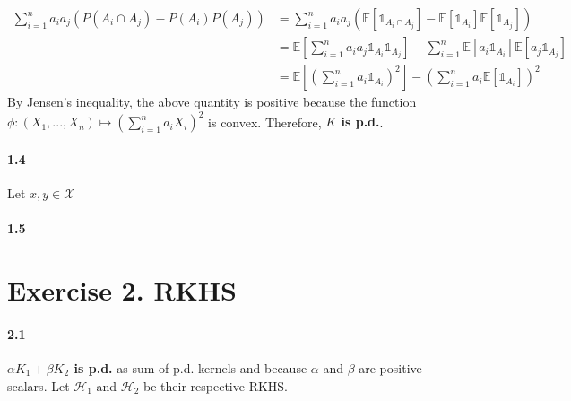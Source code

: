 \documentclass[10pt]{article}
\begin{document}
    \begin{align*}
        \sum_{i=1}^n a_i a_j (P(A_i \cap A_j) - P(A_i) P(A_j)) &= 
        \sum_{i=1}^n a_i a_j (\mathbb{E}[\mathds{1}_{A_i \cap A_j}] - 
        \mathbb{E}[\mathds{1}_{A_i}] \mathbb{E}[\mathds{1}_{A_j}])\\
        &= \mathbb{E}\left[\sum_{i=1}^n a_i a_j \mathds{1}_{A_i}\mathds{1}_{A_j} 
        \right] - \sum_{i=1}^n \mathbb{E}[a_i\mathds{1}_{A_i}] 
        \mathbb{E}[a_j\mathds{1}_{A_j}]\\
        &= \mathbb{E}\left[\left(\sum_{i=1}^n a_i\mathds{1}_{A_i}\right)^2
        \right] - \left(\sum_{i=1}^n a_i \mathbb{E}[\mathds{1}_{A_i}] \right)^2
    \end{align*}
    By Jensen's inequality, the above quantity is positive because the function
    $\phi: (X_1, ..., X_n) \mapsto (\sum_{i=1}^n a_i X_i)^2$ is convex. 
    Therefore, \textbf{$K$ is p.d.}.
    \paragraph{1.4} Let $x, y \in \mathcal{X}$
    \paragraph{1.5}

    \section*{Exercise 2. RKHS}
    \paragraph{2.1} \textbf{$\alpha K_1 + \beta K_2$ is p.d.} as sum of p.d. 
    kernels and because $\alpha$ and $\beta$ are positive scalars. Let 
    $\mathcal{H}_1$ and $\mathcal{H}_2$ be their respective RKHS.
\end{document}
